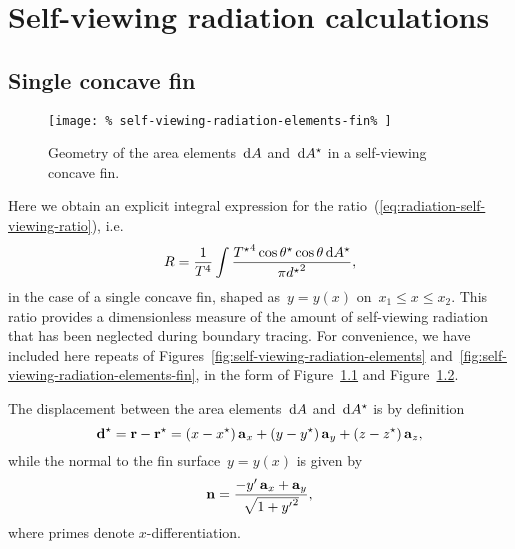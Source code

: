 \chapter{Self-viewing radiation calculations}
\label{ch:self-viewing}

\section{Single concave fin}
\label{sec:self-viewing.fin}

\begin{figure}
  \label{fig:self-viewing-radiation-elements-appendix}
\end{figure}

\begin{figure}
  \centering
  \texttt{[image: \%
    self-viewing-radiation-elements-fin\%
  ]}
  \caption{
    Geometry of the area elements~$\mathop{}\!\mathrm{d} A$ and~$\mathop{}\!\mathrm{d} A^\star$
    in a self-viewing concave fin.
  }
  \label{fig:self-viewing-radiation-elements-fin-appendix}
\end{figure}

Here we obtain an explicit integral expression
for the ratio~(\ref{eq:radiation-self-viewing-ratio}),
i.e.
\begin{equation}
  R =
    \frac{1}{T^4}
    \int
      \frac{
        {T^\star}^4 \cos\theta^\star \cos\theta \mathop{}\!\mathrm{d} A^\star
      }{
        \pi {d^\star}^2
      },
  \label{eq:radiation-self-viewing-ratio-appendix}
\end{equation}
in the case of a single concave fin,
shaped as~$y = y (x)$ on~$x_1 \le x \le x_2$.
This ratio provides a dimensionless measure
of the amount of self-viewing radiation
that has been neglected during boundary tracing.
For convenience, we have included here
repeats of Figures~\ref{fig:self-viewing-radiation-elements}
and~\ref{fig:self-viewing-radiation-elements-fin},
in the form of Figure~\ref{fig:self-viewing-radiation-elements-appendix}
and Figure~\ref{fig:self-viewing-radiation-elements-fin-appendix}.

The displacement between the area elements~$\mathop{}\!\mathrm{d} A$ and~$\mathop{}\!\mathrm{d} A^\star$ is
by definition
\begin{equation}
  \boldsymbol{\mathbf{d}}^\star
    =
      \boldsymbol{\mathbf{r}} - \boldsymbol{\mathbf{r}}^\star \\
    =
      (x - x^\star) \mathop{}\!\boldsymbol{\mathbf{a}}_{x}
        +
      (y - y^\star) \mathop{}\!\boldsymbol{\mathbf{a}}_{y}
        +
      (z - z^\star) \mathop{}\!\boldsymbol{\mathbf{a}}_{z},
  \label{eq:radiation-self-viewing-displacement-appendix}
\end{equation}
while the normal to the fin surface~$y = y (x)$ is given by
\begin{equation}
  \mathop{}\!\boldsymbol{\mathbf{n}} =
    \frac{
      -y' \mathop{}\!\boldsymbol{\mathbf{a}}_{x} + \mathop{}\!\boldsymbol{\mathbf{a}}_{y}
    }{
      \sqrt{1 + {y'}^2}
    },
  \label{eq:radiation-self-viewing-normal-vector}
\end{equation}
where primes denote $x$-differentiation.

